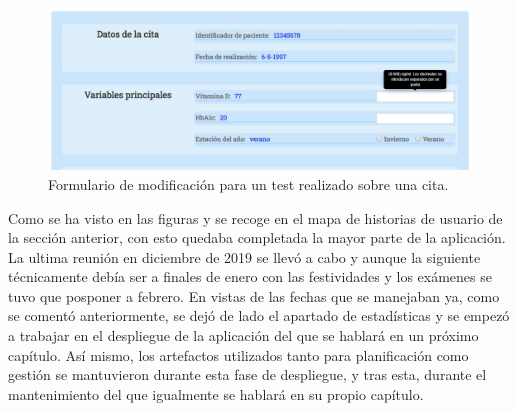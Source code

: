 \begin{figure}[h]
    \centering
     \includegraphics[width=1\textwidth]{images/modificarCita.jpg}
    \caption{Formulario de modificación para un test realizado sobre una cita.}
\end{figure}

Como se ha visto en las figuras y se recoge en el mapa de historias de usuario de la sección anterior, con esto quedaba completada la mayor parte de la aplicación. La ultima reunión en diciembre de 2019 se llevó a cabo y aunque la siguiente técnicamente debía ser a finales de enero con las festividades y los exámenes se tuvo que posponer a febrero. En vistas de las fechas que se manejaban ya, como se comentó anteriormente, se dejó de lado el apartado de estadísticas y se empezó a trabajar en el despliegue de la aplicación del que se hablará en un próximo capítulo. Así mismo, los artefactos utilizados tanto para planificación como gestión se mantuvieron durante esta fase de despliegue, y tras esta, durante el mantenimiento del que igualmente se hablará en su propio capítulo.